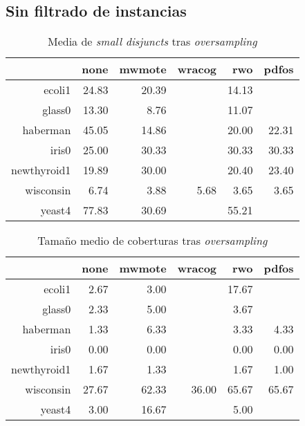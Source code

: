 \subsection{Sin filtrado de instancias}
  \begin{table}[H]
  \centering
  \begin{tabular}{rrrrrr}
   \hline
   & none & mwmote & wracog & rwo & pdfos \\ 
   \hline
   ecoli1 & 24.83 & 20.39 &  & 14.13 &  \\ 
   glass0 & 13.30 & 8.76 &  & 11.07 &  \\ 
   haberman & 45.05 & 14.86 &  & 20.00 & 22.31 \\ 
   iris0 & 25.00 & 30.33 &  & 30.33 & 30.33 \\ 
   newthyroid1 & 19.89 & 30.00 &  & 20.40 & 23.40 \\ 
   wisconsin & 6.74 & 3.88 & 5.68 & 3.65 & 3.65 \\ 
   yeast4 & 77.83 & 30.69 &  & 55.21 &  \\ 
   \hline
  \end{tabular}
  \caption{Media de \textit{small disjuncts} tras \textit{oversampling}}
  \end{table}

  \begin{table}[H]
  \centering
  \begin{tabular}{rrrrrr}
   \hline
   & none & mwmote & wracog & rwo & pdfos \\ 
   \hline
   ecoli1 & 2.67 & 3.00 &  & 17.67 &  \\ 
   glass0 & 2.33 & 5.00 &  & 3.67 &  \\ 
   haberman & 1.33 & 6.33 &  & 3.33 & 4.33 \\ 
   iris0 & 0.00 & 0.00 &  & 0.00 & 0.00 \\ 
   newthyroid1 & 1.67 & 1.33 &  & 1.67 & 1.00 \\ 
   wisconsin & 27.67 & 62.33 & 36.00 & 65.67 & 65.67 \\ 
   yeast4 & 3.00 & 16.67 &  & 5.00 &  \\ 
   \hline
  \end{tabular}
  \caption{Tamaño medio de coberturas tras \textit{oversampling}}
  \end{table}
  
